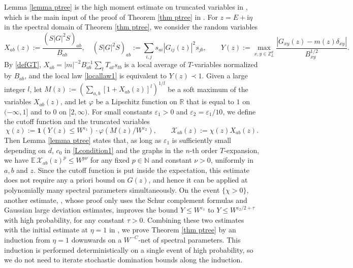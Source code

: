 \documentclass{article}
\newcommand{\1}{\mathds{1}}
\numberwithin{equation}{section}
\newcommand{\be}{\begin{equation}}
\newcommand{\ee}{\end{equation}}
\newcommand{\e}{{\varepsilon}}
\renewcommand{\cal}{\mathcal}
\newcommand{\ii}{\mathrm{i}} %
\renewcommand{\leq}{\leqslant}
\renewcommand{\le}{\leq}
\newcommand{\E}{\mathbb{E}}
\newcommand{\R}{\mathbb{R}}
\newcommand{\N}{\mathbb{N}}
\newcommand{\Z}{\mathbb{Z}}
\theoremstyle{plain} %
\theoremstyle{remark}
\begin{document}
 Lemma \ref{lemma ptree} is the high moment estimate on truncated variables in \cite[Lemma 7.4]{PartII_high}, which is the main input of the proof of Theorem \ref{thm ptree} in \cite[Section 7]{PartII_high}. For $z=E+\ii\eta$ in the spectral domain of Theorem \ref{thm ptree}, we consider the random variables
\be\label{XY intro}
X_{ab}(z):=\frac{(S|G|^2S)_{ab}}{B_{ab}},\quad (S|G|^2S)_{ab}:=\sum_{i,j}s_{ai}|G_{ij}(z)|^2 s_{jb},\qquad Y(z):=\max_{x,y\in \Z_L^d}\frac{|G_{xy}(z)-m(z)\delta_{xy}|}{B_{xy}^{1/2}} .
\ee
By \eqref{defGT}, $X_{ab}=|m|^{-2}B_{ab}^{-1}\sum_t T_{at}s_{tb}$ is a local average of $T$-variables normalized by $B_{ab}$, and the local law \eqref{locallaw1} is equivalent to $Y(z)\prec 1$. Given a large integer $l$, let $M(z):=(\sum_{a,b}[1+X_{ab}(z)]^l)^{1/l}$ be a soft maximum of the variables $X_{ab}(z)$, and let $\varphi$ be a Lipschitz function on $\R$ that is equal to $1$ on $(-\infty,1]$ and to $0$ on $[2,\infty)$. For small constants $\e_1>0$ and $\e_2=\e_1/10$, we define the cutoff function and the truncated variables
$$\chi(z):=\mathbf 1\left(Y(z)\le W^{\e_1}\right)\cdot \varphi\left(M(z)/W^{\e_2}\right),\qquad \cal X_{ab}(z):=\chi(z) X_{ab}(z).$$
Then Lemma \ref{lemma ptree} states that, as long as $\e_1$ is sufficiently small depending on $d$, $c_0$ in \eqref{Lcondition1} and the graphs in the $n$-th order $T$-expansion, we have $\E\,\cal X_{ab}(z)^p\le W^{p\nu}$ for any fixed $p\in \N$ and constant $\nu>0$, uniformly in $a,b$ and $z$. Since the cutoff function is put inside the expectation, this estimate does not require any a priori bound on $G(z)$, and hence it can be applied at polynomially many spectral parameters simultaneously. On the event $\{\chi>0\}$, another estimate, \cite[Lemma 7.3]{PartII_high}, whose proof only uses the Schur complement formulas and Gaussian large deviation estimates, improves the bound $Y\le W^{\e_1}$ to $Y\le W^{\e_2/2+\tau}$ with high probability, for any constant $\tau>0$. Combining these two estimates with the initial estimate at $\eta=1$ in \cite[Lemma 7.2]{PartII_high}, we prove Theorem \ref{thm ptree} by an induction from $\eta=1$ downwards on a $W^{-C}$-net of spectral parameters. This induction is performed deterministically on a single event of high probability, so we do not need to iterate stochastic domination bounds along the induction.
\end{document}
